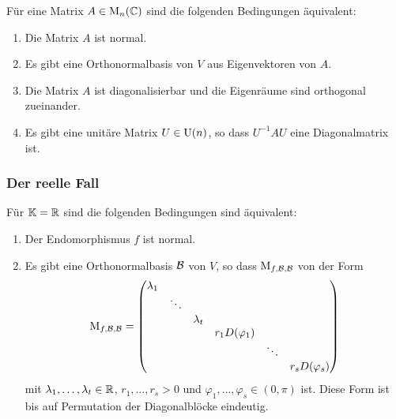 \begin{corollary}
  Für eine Matrix $A \in \operatorname{M}_{n}(\mathbb{C})$ sind die folgenden Bedingungen äquivalent:
  \begin{enumerate}
    \item
      Die Matrix $A$ ist normal.
    \item
      Es gibt eine Orthonormalbasis von $V$ aus Eigenvektoren von $A$.
    \item
      Die Matrix $A$ ist diagonalisierbar und die Eigenräume sind orthogonal zueinander.
    \item
      Es gibt eine unitäre Matrix $U \in \operatorname{U}(n)$, so dass $U^{-1} A U$ eine Diagonalmatrix ist.
  \end{enumerate}
\end{corollary}



\subsubsection{Der reelle Fall}

\begin{theorem}
  Für $\mathbb{K} = \mathbb{R}$ sind die folgenden Bedingungen sind äquivalent:
  \begin{enumerate}
    \item
      Der Endomorphismus $f$ ist normal.
    \item
      Es gibt eine Orthonormalbasis $\mathcal{B}$ von $V$, so dass $\operatorname{M}_{f, \mathcal{B}, \mathcal{B}}$ von der Form
      \begin{equation}
      \label{equation: normal form for real normal endomorphisms}
          \operatorname{M}_{f, \mathcal{B}, \mathcal{B}}
        = \begin{pmatrix}
            \lambda_1 &         &           &                   &         &                   \\
                      & \ddots  &           &                   &         &                   \\
                      &         & \lambda_t &                   &         &                   \\
                      &         &           & r_1 D(\varphi_1)  &         &                   \\
                      &         &           &                   & \ddots  &                   \\
                      &         &           &                   &         & r_s D(\varphi_s)
          \end{pmatrix}
      \end{equation}
      mit $\lambda_1, \dotsc, \lambda_t \in \mathbb{R}$, $r_1, \dotsc, r_s > 0$ und $\varphi_1, \dotsc, \varphi_s \in (0, \pi)$ ist.
      Diese Form ist bis auf Permutation der Diagonalblöcke eindeutig.
  \end{enumerate}
\end{theorem}

